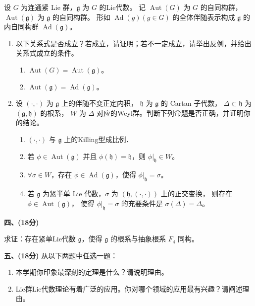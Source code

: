 设 $G$ 为连通紧 Lie 群，$\mathfrak{g}$ 为 $G$ 的Lie代数。
记 $\operatorname{Aut}(G)$ 为 $G$ 的自同构群，
$\operatorname{Aut}(\mathfrak{g})$ 为 $\mathfrak{g}$ 的自同构群。
形如 $\operatorname{Ad}(g)(g \in G)$ 的全体伴随表示构成 $\mathfrak{g}$ 的内自同构群 $\operatorname{Ad}(\mathfrak{g})$。
\begin{enumerate}[label=(\arabic*)]
\item 以下关系式是否成立？若成立，请证明；若不一定成立，请举出反例，并给出关系式成立的条件。
\begin{enumerate}[label=$\bullet$]
\item $\operatorname{Aut}(G)=\operatorname{Aut}(\mathfrak{g})$。
\item $\operatorname{Aut}(\mathfrak{g})=\operatorname{Ad}(\mathfrak{g})$。
\end{enumerate}
\item 设 $(\cdot, \cdot)$ 为 $\mathfrak{g}$ 上的伴随不变正定内积，
$\mathfrak{h}$ 为 $\mathfrak{g}$ 的 Cartan 子代数，
$\Delta \subset \mathfrak{h}$ 为 $(\mathfrak{g}, \mathfrak{h})$ 的根系，
$W$ 为 $\Delta$ 对应的Weyl群。判断下列命题是否正确，并证明你的结论。
\begin{enumerate}[label=$\bullet$]
\item $(\cdot, \cdot)$ 与 $\mathfrak{g}$ 上的Killing型成比例．
\item 若 $\phi \in \operatorname{Aut}(\mathfrak{g})$ 并且 $\phi(\mathfrak{h})=\mathfrak{h}$，则 $\phi|_{\mathfrak{h}} \in W$。
\item $\forall \sigma \in W$，存在 $\phi \in \operatorname{Ad}(\mathfrak{g})$，使得 $\phi|_{\mathfrak{h}}=\sigma$。
\item 若 $\mathfrak{g}$ 为紧半单 Lie 代数，$\sigma$ 为 $(\mathfrak{h},(\cdot, \cdot))$ 上的正交变换，
则存在 $\phi \in \operatorname{Aut}(\mathfrak{g})$，
使得 $\phi|_{\mathfrak{h}}=\sigma$ 的充要条件是 $\sigma(\Delta)=\Delta$。
\end{enumerate}
\end{enumerate}
\textbf{四、(18分)}

求证：存在紧单Lie代数 $\mathfrak{g}$，使得 $\mathfrak{g}$ 的根系与抽象根系 $F_4$ 同构。

\textbf{五、(18分)} 从以下两题中任选一题：
\begin{enumerate}[label=(\arabic*)]
\item 本学期你印象最深刻的定理是什么？请说明理由。
\item Lie群Lie代数理论有着广泛的应用。你对哪个领域的应用最有兴趣？请阐述理由。
\end{enumerate}

